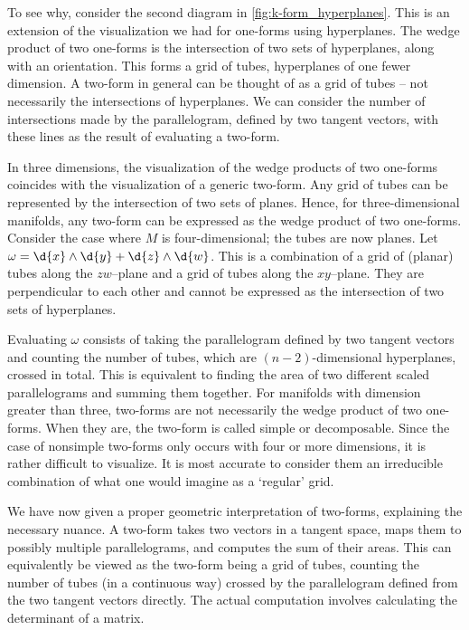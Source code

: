 \documentclass[a4paper,12pt]{article}
\begin{document}
To see why, consider the second diagram in \cref{fig:k-form_hyperplanes}.
This is an extension of the visualization we had for one-forms using hyperplanes.
The wedge product of two one-forms is the intersection of two sets of hyperplanes, along with an orientation.
This forms a grid of tubes, hyperplanes of one fewer dimension.
A two-form in general can be thought of as a grid of tubes -- not necessarily the intersections of hyperplanes.
We can consider the number of intersections made by the parallelogram, defined by two tangent vectors, with these lines as the result of evaluating a two-form.

In three dimensions, the visualization of the wedge products of two one-forms coincides with the visualization of a generic two-form.
Any grid of tubes can be represented by the intersection of two sets of planes.
Hence, for three-dimensional manifolds, any two-form can be expressed as the wedge product of two one-forms.
Consider the case where $M$ is four-dimensional; the tubes are now planes.
Let $\omega = \d{x} \wedge \d{y} + \d{z} \wedge \d{w}$.
This is a combination of a grid of (planar) tubes along the $zw$--plane and a grid of tubes along the $xy$--plane.
They are perpendicular to each other and cannot be expressed as the intersection of two sets of hyperplanes.

Evaluating $\omega$ consists of taking the parallelogram defined by two tangent vectors and counting the number of tubes, which are $(n-2)$-dimensional hyperplanes, crossed in total.
This is equivalent to finding the area of two different scaled parallelograms and summing them together.
For manifolds with dimension greater than three, two-forms are not necessarily the wedge product of two one-forms.
When they are, the two-form is called simple or decomposable.
Since the case of nonsimple two-forms only occurs with four or more dimensions, it is rather difficult to visualize.
It is most accurate to consider them an irreducible combination of what one would imagine as a `regular' grid.

We have now given a proper geometric interpretation of two-forms, explaining the necessary nuance.
A two-form takes two vectors in a tangent space, maps them to possibly multiple parallelograms, and computes the sum of their areas.
This can equivalently be viewed as the two-form being a grid of tubes, counting the number of tubes (in a continuous way) crossed by the parallelogram defined from the two tangent vectors directly.
The actual computation involves calculating the determinant of a matrix.
\end{document}
